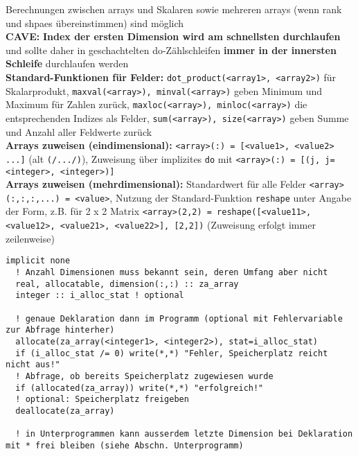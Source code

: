 \documentclass[a4paper, twocolumn]{scrarticle}
\begin{document}
Berechnungen zwischen arrays und Skalaren sowie mehreren arrays (wenn rank und shpaes übereinstimmen) sind möglich\\
\textbf{CAVE:} \textbf{Index der ersten Dimension wird am schnellsten durchlaufen} und sollte daher in geschachtelten do-Zählschleifen \textbf{immer in der innersten Schleife} durchlaufen werden\\
\textbf{Standard-Funktionen für Felder:} \lstinline|dot_product(<array1>, <array2>)| für Skalarprodukt, \lstinline|maxval(<array>), minval(<array>)| geben Minimum und Maximum für Zahlen zurück, \lstinline|maxloc(<array>), minloc(<array>)| die entsprechenden Indizes als Felder, \lstinline|sum(<array>), size(<array>)| geben Summe und Anzahl aller Feldwerte zurück\\
\textbf{Arrays zuweisen (eindimensional):} \lstinline|<array>(:) = [<value1>, <value2> ...]| (alt \lstinline|(/.../)|), Zuweisung über implizites \lstinline|do| mit \lstinline|<array>(:) = [(j, j=<integer>, <integer>)]|\\
\textbf{Arrays zuweisen (mehrdimensional):} Standardwert für alle Felder \lstinline|<array>(:,:,:,...) = <value>|, Nutzung der Standard-Funktion \lstinline|reshape| unter Angabe der Form, z.B. für 2 x 2 Matrix \lstinline|<array>(2,2) = reshape([<value11>, <value12>, <value21>, <value22>], [2,2])| (Zuweisung erfolgt immer zeilenweise)
\begin{lstlisting}[caption={\bfseries Allocatable Arrays (Genaue Größe nicht bei Deklaration bekannt)}]
  implicit none
  ! Anzahl Dimensionen muss bekannt sein, deren Umfang aber nicht
  real, allocatable, dimension(:,:) :: za_array
  integer :: i_alloc_stat ! optional
  
  ! genaue Deklaration dann im Programm (optional mit Fehlervariable zur Abfrage hinterher)
  allocate(za_array(<integer1>, <integer2>), stat=i_alloc_stat)
  if (i_alloc_stat /= 0) write(*,*) "Fehler, Speicherplatz reicht nicht aus!"
  ! Abfrage, ob bereits Speicherplatz zugewiesen wurde
  if (allocated(za_array)) write(*,*) "erfolgreich!"
  ! optional: Speicherplatz freigeben
  deallocate(za_array)

  ! in Unterprogrammen kann ausserdem letzte Dimension bei Deklaration mit * frei bleiben (siehe Abschn. Unterprogramm)
\end{lstlisting}
\end{document}
